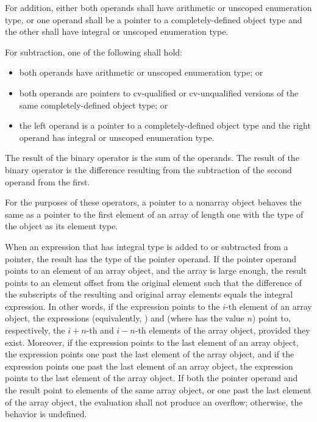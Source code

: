 %
For addition, either both operands shall have arithmetic or unscoped enumeration
type, or one operand shall be a pointer to a completely-defined object
type and the other shall have integral or unscoped enumeration type.

\pnum
For subtraction, one of the following shall hold:

\begin{itemize}
\item both operands have arithmetic or unscoped enumeration type; or

%
\item both operands are pointers to cv-qualified or cv-unqualified
versions of the same completely-defined object type; or

\item the left operand is a pointer to a completely-defined object type
and the right operand has integral or unscoped enumeration type.
\end{itemize}

\pnum
The result of the binary \tcode{+} operator is the sum of the operands.
The result of the binary \tcode{-} operator is the difference resulting
from the subtraction of the second operand from the first.

\pnum
{}%
For the purposes of these operators, a pointer to a nonarray object
behaves the same as a pointer to the first element of an array of length
one with the type of the object as its element type.

\pnum
When an expression that has integral type is added to or subtracted from
a pointer, the result has the type of the pointer operand. If the
pointer operand points to an element of an array object, and the array
is large enough, the result points to an element offset from the
original element such that the difference of the subscripts of the
resulting and original array elements equals the integral expression. In
other words, if the expression  points to the $i$-th element of
an array object, the expressions  (equivalently,
) and  (where  has the value $n$)
point to, respectively, the $i+n$-th and $i-n$-th elements of the array
object, provided they exist. Moreover, if the expression 
points to the last element of an array object, the expression
 points one past the last element of the array object, and
if the expression  points one past the last element of an array
object, the expression  points to the last element of the
array object. If both the pointer operand and the result point to
elements of the same array object, or one past the last element of the
array object, the evaluation shall not produce an overflow; otherwise,
the behavior is undefined.

